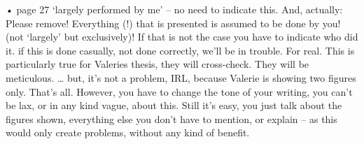 


• page 27 ‘largely performed by me’ – no need to indicate this. And, actually: Please remove! Everything (!) that is presented is assumed to be done by you! (not ‘largely’ but exclusively)! If that is not the case you have to indicate who did it. if this is done casually, not done correctly, we’ll be in trouble. For real. This is particularly true for Valeries thesis, they will cross-check. They will be meticulous. … but, it’s not a problem, IRL, because Valerie is showing two figures only. That’s all. However, you have to change the tone of your writing, you can’t be lax, or in any kind vague, about this. Still it’s easy, you just talk about the figures shown, everything else you don’t have to mention, or explain – as this would only create problems, without any kind of benefit.





